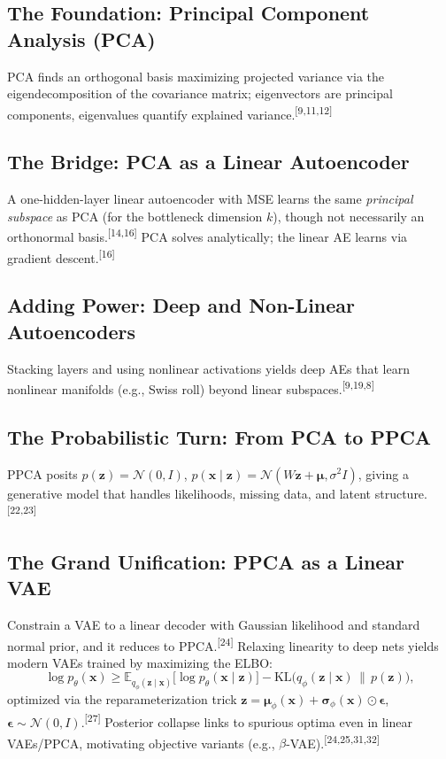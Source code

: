 \documentclass[11pt]{article}
\newcommand{\refnum}[1]{\textsuperscript{[#1]}}
\begin{document}
\subsection{The Foundation: Principal Component Analysis (PCA)}
PCA finds an orthogonal basis maximizing projected variance via the eigendecomposition of the covariance matrix; eigenvectors are principal components, eigenvalues quantify explained variance.\refnum{9,11,12}

\subsection{The Bridge: PCA as a Linear Autoencoder}
A one-hidden-layer linear autoencoder with MSE learns the same \emph{principal subspace} as PCA (for the bottleneck dimension $k$), though not necessarily an orthonormal basis.\refnum{14,16} PCA solves analytically; the linear AE learns via gradient descent.\refnum{16}

\subsection{Adding Power: Deep and Non-Linear Autoencoders}
Stacking layers and using nonlinear activations yields deep AEs that learn nonlinear manifolds (e.g., Swiss roll) beyond linear subspaces.\refnum{9,19,8}

\subsection{The Probabilistic Turn: From PCA to PPCA}
PPCA posits $p(\mathbf{z})=\mathcal{N}(0,I)$, $p(\mathbf{x}\mid\mathbf{z})=\mathcal{N}(W\mathbf{z}+\boldsymbol{\mu},\sigma^2 I)$, giving a generative model that handles likelihoods, missing data, and latent structure.\refnum{22,23}

\subsection{The Grand Unification: PPCA as a Linear VAE}
Constrain a VAE to a linear decoder with Gaussian likelihood and standard normal prior, and it reduces to PPCA.\refnum{24} Relaxing linearity to deep nets yields modern VAEs trained by maximizing the ELBO:
\[
\log p_\theta(\mathbf{x}) \ge
\mathbb{E}_{q_\phi(\mathbf{z}\mid\mathbf{x})}\!\big[\log p_\theta(\mathbf{x}\mid\mathbf{z})\big]
- \mathrm{KL}\!\big(q_\phi(\mathbf{z}\mid\mathbf{x})\,\|\,p(\mathbf{z})\big),
\]
optimized via the reparameterization trick $\mathbf{z}=\boldsymbol{\mu}_\phi(\mathbf{x})+\boldsymbol{\sigma}_\phi(\mathbf{x})\odot\boldsymbol{\epsilon}$, $\boldsymbol{\epsilon}\sim\mathcal{N}(0,I)$.\refnum{27}
Posterior collapse links to spurious optima even in linear VAEs/PPCA, motivating objective variants (e.g., $\beta$-VAE).\refnum{24,25,31,32}
\end{document}
